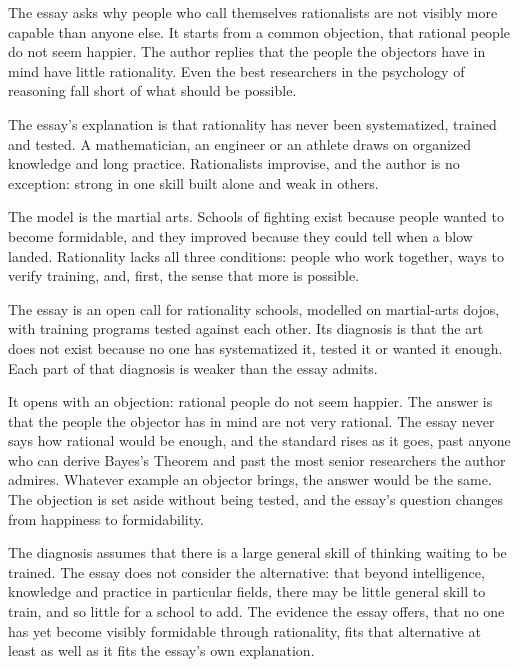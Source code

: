 \begin{afterword}
\summaryhead

The essay asks why people who call themselves rationalists are not visibly more capable than anyone else. It starts from a common objection, that rational people do not seem happier. The author replies that the people the objectors have in mind have little rationality. Even the best researchers in the psychology of reasoning fall short of what should be possible.

The essay's explanation is that rationality has never been systematized, trained and tested. A mathematician, an engineer or an athlete draws on organized knowledge and long practice. Rationalists improvise, and the author is no exception: strong in one skill built alone and weak in others.

The model is the martial arts. Schools of fighting exist because people wanted to become formidable, and they improved because they could tell when a blow landed. Rationality lacks all three conditions: people who work together, ways to verify training, and, first, the sense that more is possible.

\responsehead

The essay is an open call for rationality schools, modelled on martial-arts dojos, with training programs tested against each other. Its diagnosis is that the art does not exist because no one has systematized it, tested it or wanted it enough. Each part of that diagnosis is weaker than the essay admits.

It opens with an objection: rational people do not seem happier. The answer is that the people the objector has in mind are not very rational. The essay never says how rational would be enough, and the standard rises as it goes, past anyone who can derive Bayes's Theorem and past the most senior researchers the author admires. Whatever example an objector brings, the answer would be the same. The objection is set aside without being tested, and the essay's question changes from happiness to formidability.

The diagnosis assumes that there is a large general skill of thinking waiting to be trained. The essay does not consider the alternative: that beyond intelligence, knowledge and practice in particular fields, there may be little general skill to train, and so little for a school to add. The evidence the essay offers, that no one has yet become visibly formidable through rationality, fits that alternative at least as well as it fits the essay's own explanation.


\end{afterword}
